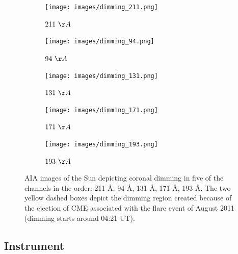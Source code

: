\begin{figure}[h!]

    \begin{subfigure}[b]{0.3\textwidth}
        \centering
        \texttt{[image: images/dimming\_211.png]}
        \caption{$211 \ \AA$}
        \label{fig:dimming_211}
    \end{subfigure}
    \hfill
    \begin{subfigure}[b]{0.3\textwidth}
        \centering
        \texttt{[image: images/dimming\_94.png]}
        \caption{$94 \ \AA$}
        \label{fig:dimming_94}
    \end{subfigure}
    \hfill
    \begin{subfigure}[b]{0.3\textwidth}
        \centering
        \texttt{[image: images/dimming\_131.png]}
        \caption{$131 \ \AA$}
        \label{fig:dimming_131}
    \end{subfigure}

    \hfill
    \begin{subfigure}[b]{0.3\textwidth}
        \centering
        \texttt{[image: images/dimming\_171.png]}
        \caption{$171 \ \AA$}
        \label{fig:dimming_171}
    \end{subfigure}
    \hspace{0.5cm}
    \begin{subfigure}[b]{0.3\textwidth}
        \centering
        \texttt{[image: images/dimming\_193.png]}
        \caption{$193 \ \AA$}
        \label{fig:dimming_193}
    \end{subfigure}
    \hfill
    \label{fig:dimming_5_channels}
    \caption[AIA images of Coronal Dimming regions on the Sun]{AIA images of the Sun depicting coronal dimming in five of the channels in the order: 211 \AA, 94 \AA, 131 \AA, 171 \AA, 193 \AA. The two yellow dashed boxes depict the dimming region created because of the ejection of CME associated with the flare event of  August 2011 (dimming starts around 04:21 UT).}
\end{figure}

\subsection{Instrument}

